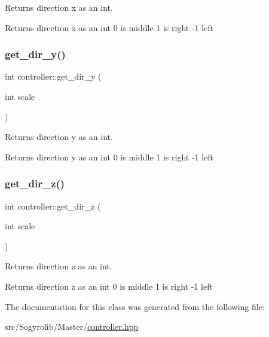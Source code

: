 Returns direction x as an int. 

Returns direction x as an int 0 is middle 1 is right -\/1 left \mbox{\label{classcontroller_a6947eb778084e6c5b74b993f0fda3eaf}} 
\subsubsection{\texorpdfstring{get\+\_\+dir\+\_\+y()}{get\_dir\_y()}}
{\footnotesize\ttfamily int controller\+::get\+\_\+dir\+\_\+y (\begin{DoxyParamCaption}\item[{int}]{scale }\end{DoxyParamCaption})\hspace{0.3cm}{\ttfamily [inline]}}



Returns direction y as an int. 

Returns direction y as an int 0 is middle 1 is right -\/1 left \mbox{\label{classcontroller_a26c377443455cda82579776db7e2b404}} 
\subsubsection{\texorpdfstring{get\+\_\+dir\+\_\+z()}{get\_dir\_z()}}
{\footnotesize\ttfamily int controller\+::get\+\_\+dir\+\_\+z (\begin{DoxyParamCaption}\item[{int}]{scale }\end{DoxyParamCaption})\hspace{0.3cm}{\ttfamily [inline]}}



Returns direction z as an int. 

Returns direction z as an int 0 is middle 1 is right -\/1 left 

The documentation for this class was generated from the following file\+:\begin{DoxyCompactItemize}
\item 
src/\+Sogyrolib/\+Master/\hyperlink{controller_8hpp}{controller.\+hpp}\end{DoxyCompactItemize}
